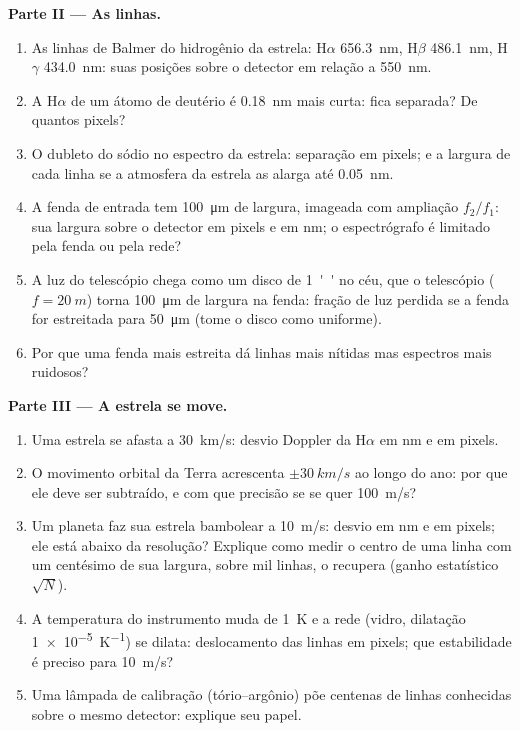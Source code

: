 \begin{problem}
\medskip
\noindent\textbf{Parte II --- As linhas.}
\begin{enumerate}[resume]
  \item As linhas de Balmer do hidrogênio da estrela: H$\alpha$ \qty{656.3}{nm},
        H$\beta$ \qty{486.1}{nm}, H$\gamma$ \qty{434.0}{nm}: suas posições sobre o
        detector em relação a \qty{550}{nm}.
  \item A H$\alpha$ de um átomo de deutério é \qty{0.18}{nm} mais curta: fica separada?
        De quantos pixels?
  \item O dubleto do sódio no espectro da estrela: separação em
        pixels; e a largura de cada linha se a atmosfera da estrela
        as alarga até \qty{0.05}{nm}.
  \item A fenda de entrada tem \qty{100}{\micro m} de largura, imageada com
        ampliação $f_2/f_1$: sua largura sobre o detector em pixels e
        em nm; o espectrógrafo é limitado pela fenda ou pela rede?
  \item A luz do telescópio chega como um disco de \qty{1}{''} no
        céu, que o telescópio ($f = \qty{20}{m}$) torna \qty{100}{\micro m}
        de largura na fenda: fração de luz perdida se a fenda for
        estreitada para \qty{50}{\micro m} (tome o disco como uniforme).
  \item Por que uma fenda mais estreita dá linhas mais nítidas mas espectros
        mais ruidosos?
\end{enumerate}

\medskip
\noindent\textbf{Parte III --- A estrela se move.}
\begin{enumerate}[resume]
  \item Uma estrela se afasta a \qty{30}{km/s}: desvio Doppler da H$\alpha$ em nm
        e em pixels.
  \item O movimento orbital da Terra acrescenta $\pm\qty{30}{km/s}$ ao longo do ano:
        por que ele deve ser subtraído, e com que precisão se se quer
        \qty{100}{m/s}?
  \item Um planeta faz sua estrela bambolear a \qty{10}{m/s}: desvio em nm e
        em pixels; ele está abaixo da resolução? Explique como medir
        o centro de uma linha com um centésimo de sua largura, sobre
        mil linhas, o recupera (ganho estatístico $\sqrt{N}$).
  \item A temperatura do instrumento muda de \qty{1}{K} e a
        rede (vidro, dilatação \qty{1e-5}{K^{-1}}) se dilata: deslocamento das
        linhas em pixels; que estabilidade é preciso para \qty{10}{m/s}?
  \item Uma lâmpada de calibração (tório--argônio) põe centenas de linhas
        conhecidas sobre o mesmo detector: explique seu papel.
\end{enumerate}


\end{problem}
